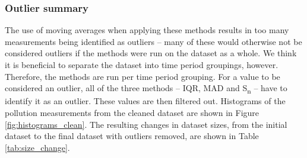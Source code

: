 \documentclass[11pt]{report}
\begin{document}
\subsubsection{Outlier summary}

The use of moving averages when applying these methods results in too many measurements being identified as outliers -- many of these would otherwise not be considered outliers if the methods were run on the dataset as a whole. We think it is beneficial to separate the dataset into time period groupings, however. Therefore, the methods are run per time period grouping. For a value to be considered an outlier, all of the three methods -- IQR, MAD and S\textsubscript{n} -- have to identify it as an outlier. These values are then filtered out. Histograms of the pollution measurements from the cleaned dataset are shown in Figure \ref{fig:histograms_clean}. The resulting changes in dataset sizes, from the initial dataset to the final dataset with outliers removed, are shown in Table \ref{tab:size_change}.
\end{document}
